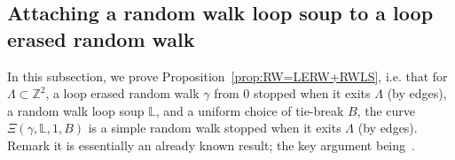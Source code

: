 \documentclass[11pt]{article}
\newtheorem{remark}[theorem]{Remark}
\def\Att{{\Xi}}
\begin{document}
\subsection{Attaching a random walk loop soup to a loop erased random walk}
In this subsection, we prove Proposition~\ref{prop:RW=LERW+RWLS}, i.e. that for $\Lambda\subset \mathbb{Z}^2$, a loop erased random walk $\gamma$ from $0$ stopped when it exits $\Lambda$ (by edges), a random walk loop soup $\mathbb{L}$, and a uniform choice of tie-break $B$, the curve $\Att(\gamma,\mathbb{L},1,B)$ is a simple random walk stopped when it exits $\Lambda$ (by edges). Remark it is essentially an already known result; the key argument being~\cite[Proposition~9.4.1]{LawlerLimic}.
\end{document}
